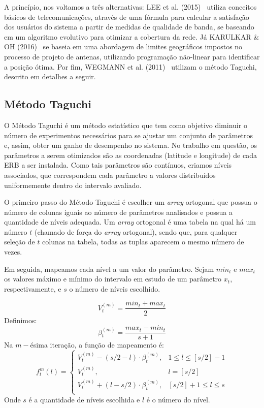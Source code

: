 \documentclass[]{politex}
\begin{document}
A princípio, nos voltamos a três alternativas: LEE et al. (2015)~
\cite{evolutivo} utiliza conceitos básicos de telecomunicações, através de uma
fórmula para calcular a satisfação dos usuários do sistema a partir de medidas
de qualidade de banda, se baseando em um algoritmo evolutivo para otimizar a
cobertura da rede. Já KARULKAR \& OH (2016)~\cite{nao-linear} se baseia em uma
abordagem de limites geográficos impostos no processo de projeto de antenas,
utilizando programação não-linear para identificar a posição ótima. Por fim,
WEGMANN et al. (2011)~\cite{taguchi} utilizam o método Taguchi, descrito em
detalhes a seguir.

\subsection{Método Taguchi}

O Método Taguchi é um método estatístico que tem como objetivo diminuir o número
de experimentos necessários para se ajustar um conjunto de parâmetros e, assim,
obter um ganho de desempenho no sistema. No trabalho em questão, os parâmetros a
serem otimizados são as coordenadas (latitude e longitude) de cada ERB a ser
instalada. Como tais parâmetros são contínuos, criamos níveis associados, que
correspondem cada parâmetro a valores distribuídos uniformemente dentro do
intervalo avaliado.

O primeiro passo do Método Taguchi é escolher um \textit{array} ortogonal que
possua o número de colunas iguais ao número de parâmetros analisados e possua a
quantidade de níveis adequada. Um \textit{array} ortogonal é uma tabela na qual
há um número $t$ (chamado de força do \textit{array} ortogonal), sendo que, para
qualquer seleção de $t$ colunas na tabela, todas as tuplas aparecem o mesmo
número de vezes.

Em seguida, mapeamos cada nível a um valor do parâmetro. Sejam $min_t$ e $max_t$
os valores máximo e mínimo do intervalo em estudo de um parâmetro $x_t$,
respectivamente, e $s$ o número de níveis escolhido.

\begin{equation}
    V_t^{(m)}=\frac{min_t+max_t}{2}
\end{equation}
Definimos:
\begin{equation}
    \beta_t^{(m)} = \frac{max_t-min_t}{s+1}
\end{equation}
Na $m-$ésima iteração, a função de mapeamento é:
\begin{equation}
    f_t^m(l) =
    \begin{cases}
        V_t^{(m)} - (s/2 - l)\cdot\beta_t^{(m)}, & 1 \leq l \leq [s/2] - 1 \\
        V_t^{(m)}, &  l = [s/2]\\
        V_t^{(m)} + (l - s/2)\cdot\beta_t^{(m)}, & [s/2] + 1 \leq l \leq s \\
    \end{cases}
\end{equation}
Onde $s$ é a quantidade de níveis escolhida e $l$ é o número do nível.
\end{document}
